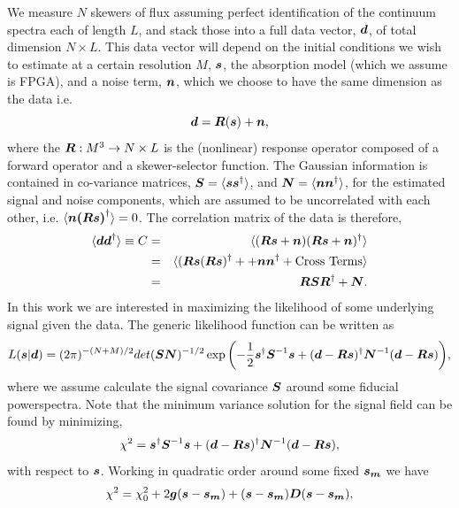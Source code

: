 \documentclass[usenatbib,onecolumn]{mnras}
\def\bi#1{\hbox{\boldmath{$#1$}}}
\begin{document}
We measure $N$ skewers of flux assuming perfect identification of the continuum spectra each of length $L$, and stack those into a full data vector, $\bi{d}$, of total dimension $N \times L$.  This data vector will depend on the initial conditions we wish to estimate at a certain resolution $M$, $\bi{s}$, the absorption model (which we assume is FPGA), and a noise term, $\bi{n}$, which we choose to have the same dimension as the data i.e.
\begin{equation}
\bi{d}=\bi{R}(\bi{s}) + \bi{n}
\label{eq:ddecomp},
\end{equation}
where the $\bi{R}: M^3 \rightarrow N\times L$ is the (nonlinear) response operator composed of a forward operator and a skewer-selector function. The Gaussian information is contained in co-variance matrices, $\bi{S}=\langle \bi{s}\bi{s}^\dagger \rangle$, and $\bi{N}=\langle \bi{n}\bi{n}^\dagger \rangle$, for the estimated signal and noise components, which are assumed to be uncorrelated with each other, i.e. $ \langle \bi{n}\bi{(Rs)}^\dagger \rangle = 0$. The correlation matrix of the data is therefore,
\begin{eqnarray}
\langle \bi{d}\bi{d}^\dagger \rangle \equiv C &=& \langle (\bi{R}\bi{s}+ \bi{n})(\bi{R}\bi{s}+ \bi{n})^\dagger \rangle \nonumber \\
&=& \langle (\bi{R}\bi{s} (\bi{R}\bi{s})^\dagger + + \bi{n} \bi{n}^\dagger + \text{Cross Terms} \rangle \nonumber \\
&=& \bi{R}\bi{S}\bi{R}^\dagger  + \bi{N}.
\end{eqnarray}
In this work we are interested in maximizing the likelihood of some underlying signal given the data. The generic likelihood function can be written as
\begin{equation}
L(\bi{s}|\bi{d}) = (2 \pi)^{-(N+M)/2} det(\bi{SN})^{-1/2} \exp{\left(-\frac{1}{2}\bi{s}^\dagger \bi{S}^{-1} \bi{s} + (\bi{d}-\bi{Rs})^\dag \bi{N}^{-1}(\bi{d}-\bi{Rs}) \right)},
\label{eq_likeb}
\end{equation}
where we assume calculate the signal covariance $\bi{S}$ around some fiducial powerspectra. Note that the minimum variance solution for the signal field can be found by minimizing,
\begin{equation}
\chi^2 = \bi{s}^\dagger \bi{S}^{-1} \bi{s} + (\bi{d}-\bi{Rs})^\dag \bi{N}^{-1}(\bi{d}-\bi{Rs}),
\label{eq_chi}
\end{equation}
with respect to $\bi{s}$. Working in quadratic order around some fixed $\bi{s_m}$ we have
\begin{equation}
\chi^2 = \chi_0^2 + 2 \bi{g}(\bi{s}-\bi{s_m})+ (\bi{s}-\bi{s_m})\bi{D}(\bi{s}-\bi{s_m}),
\label{eq_chib}
\end{equation}
\end{document}
